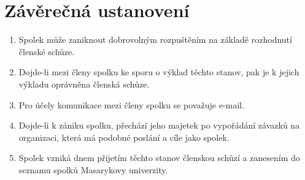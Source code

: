 \documentclass[11pt]{article}
\begin{document}
\section{Závěrečná ustanovení}
\begin{enumerate}
\item Spolek může zaniknout dobrovolným rozpuštěním na základě rozhodnutí členské schůze.
\item Dojde-li mezi členy spolku ke sporu o výklad těchto stanov, pak je k jejich výkladu oprávněna členská schůze.
\item Pro účely komunikace mezi členy spolku se považuje e-mail.
\item Dojde-li k zániku spolku, přechází jeho majetek po vypořádání závazků na organizaci, která má podobné poslání a cíle jako spolek.
\item Spolek vzniká dnem přijetím těchto stanov členskou schůzí a zanesením do seznamu spolků Masarykovy univerzity.
\end{enumerate}
\end{document}
